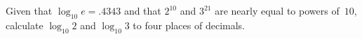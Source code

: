 Given that $\log_{10} e = .4343$ and that $2^{10}$ and $3^{21}$ are nearly equal to powers
of~$10$, calculate $\log_{10}2$ and $\log_{10}3$ to four places of decimals. 

